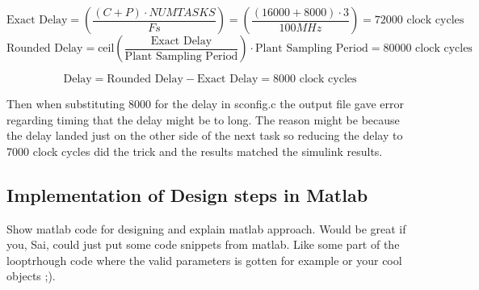 \begin{equation}
	\text{Exact Delay}=\left(\dfrac{(C+P)\cdot NUMTASKS}{Fs} \right) = \left(\dfrac{(16000+8000)\cdot 3}{100MHz} \right) = 72000 \text{ clock cycles}
	\label{eq:delay}
\end{equation}
\begin{equation}
	\text{Rounded Delay}= \text{ceil}\left(\dfrac{\text{Exact Delay}}{\text{Plant Sampling Period}}\right) \cdot \text{Plant Sampling Period} = 80000 \text{ clock cycles}
\label{eq:rounddelay}
\end{equation}

\begin{equation}
\text{Delay}=\text{Rounded Delay} - \text{Exact Delay}= 8000 \text{ clock cycles}
\label{eq:delayall}
\end{equation}

Then when substituting 8000 for the delay in sconfig.c the output file gave error regarding timing that the delay might be to long. The reason might be because the delay landed just on the other side of the next task so reducing the delay to 7000 clock cycles did the trick and the results matched the simulink results.

\subsection{Implementation of Design steps in Matlab}
\color{red}
Show matlab code for designing and explain matlab approach. Would be great if you, Sai, could just put some code snippets from matlab. Like some part of the looptrhough code where the valid parameters is gotten for example or your cool objects ;).
\color{black}

\begin{lstlisting}[language=matlab,caption={Matlab code showing the loopthrough function }]
%Matlab code
\end{lstlisting}


